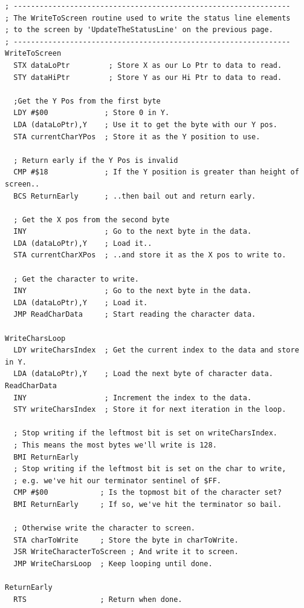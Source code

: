 \clearpage
\begin{lstlisting}[basicstyle=\scriptsize\ttfamily, escapechar=\%]
; ----------------------------------------------------------------
; The WriteToScreen routine used to write the status line elements
; to the screen by 'UpdateTheStatusLine' on the previous page.
; ----------------------------------------------------------------
WriteToScreen
  STX dataLoPtr         ; Store X as our Lo Ptr to data to read.
  STY dataHiPtr         ; Store Y as our Hi Ptr to data to read.

  ;Get the Y Pos from the first byte
  LDY #$00             ; Store 0 in Y.
  LDA (dataLoPtr),Y    ; Use it to get the byte with our Y pos.
  STA currentCharYPos  ; Store it as the Y position to use.

  ; Return early if the Y Pos is invalid
  CMP #$18             ; If the Y position is greater than height of screen..
  BCS ReturnEarly      ; ..then bail out and return early.

  ; Get the X pos from the second byte
  INY                  ; Go to the next byte in the data.
  LDA (dataLoPtr),Y    ; Load it..
  STA currentCharXPos  ; ..and store it as the X pos to write to.

  ; Get the character to write.
  INY                  ; Go to the next byte in the data.
  LDA (dataLoPtr),Y    ; Load it.
  JMP ReadCharData     ; Start reading the character data.

WriteCharsLoop
  LDY writeCharsIndex  ; Get the current index to the data and store in Y.
  LDA (dataLoPtr),Y    ; Load the next byte of character data.
ReadCharData 
  INY                  ; Increment the index to the data.
  STY writeCharsIndex  ; Store it for next iteration in the loop.

  ; Stop writing if the leftmost bit is set on writeCharsIndex.
  ; This means the most bytes we'll write is 128.
  BMI ReturnEarly
  ; Stop writing if the leftmost bit is set on the char to write,
  ; e.g. we've hit our terminator sentinel of $FF.
  CMP #$00            ; Is the topmost bit of the character set?
  BMI ReturnEarly     ; If so, we've hit the terminator so bail.

  ; Otherwise write the character to screen.
  STA charToWrite     ; Store the byte in charToWrite.
  JSR WriteCharacterToScreen ; And write it to screen.
  JMP WriteCharsLoop  ; Keep looping until done.

ReturnEarly
  RTS                 ; Return when done.
\end{lstlisting}
